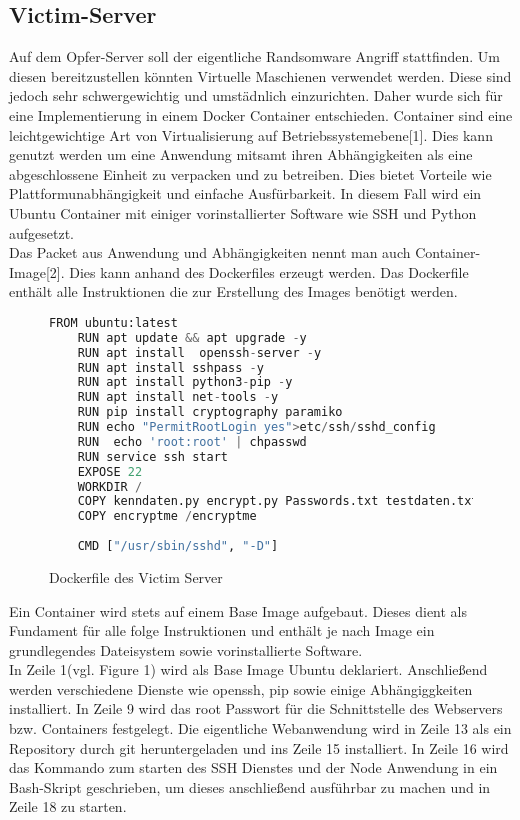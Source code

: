 \documentclass[12pt]{article}
\begin{document}
\subsection{Victim-Server}
	Auf dem Opfer-Server soll der eigentliche Randsomware Angriff stattfinden. Um diesen bereitzustellen könnten Virtuelle Maschienen verwendet werden. Diese sind jedoch sehr schwergewichtig und umstädnlich einzurichten.
	Daher wurde sich für eine Implementierung in einem Docker Container entschieden.
	Container sind eine leichtgewichtige Art von Virtualisierung auf Betriebssystemebene[1]. Dies kann genutzt werden um eine Anwendung mitsamt ihren Abhängigkeiten als eine abgeschlossene Einheit zu verpacken und zu betreiben. Dies bietet Vorteile wie Plattformunabhängigkeit und einfache Ausfürbarkeit. In diesem Fall wird ein Ubuntu Container mit einiger vorinstallierter Software wie SSH und Python aufgesetzt.\\
	Das Packet aus Anwendung und Abhängigkeiten
	nennt man auch Container-Image[2]. Dies kann anhand des Dockerfiles erzeugt werden. Das Dockerfile enthält alle Instruktionen die zur Erstellung des Images benötigt werden.  
	\begin{figure}[h]
	\caption{Dockerfile des Victim Server}
	\begin{lstlisting}[language=python, style=code]
	FROM ubuntu:latest
	RUN apt update && apt upgrade -y 
	RUN apt install  openssh-server -y
	RUN apt install sshpass -y
	RUN apt install python3-pip -y 
	RUN apt install net-tools -y 
	RUN pip install cryptography paramiko
	RUN echo "PermitRootLogin yes">etc/ssh/sshd_config
	RUN  echo 'root:root' | chpasswd
	RUN service ssh start
	EXPOSE 22
	WORKDIR /
	COPY kenndaten.py encrypt.py Passwords.txt testdaten.txt /
	COPY encryptme /encryptme
	
	CMD ["/usr/sbin/sshd", "-D"]
		\end{lstlisting}
		
		\end{figure}
\newpage
Ein Container wird stets auf einem Base Image aufgebaut. Dieses dient als Fundament für alle folge Instruktionen und enthält je nach Image ein grundlegendes Dateisystem sowie vorinstallierte Software.\\
In Zeile 1(vgl. Figure 1) wird als Base Image Ubuntu deklariert. 
Anschließend werden verschiedene Dienste wie openssh, pip sowie einige Abhängiggkeiten installiert.
In Zeile 9 wird das root Passwort für die Schnittstelle des Webservers bzw. Containers festgelegt. Die eigentliche Webanwendung wird in Zeile 13 als ein Repository durch git heruntergeladen und ins Zeile 15 installiert. In Zeile 16 wird das Kommando zum starten des SSH Dienstes und der Node Anwendung in ein Bash-Skript geschrieben, um dieses anschließend ausführbar zu machen und in Zeile 18 zu starten.\\
\end{document}
